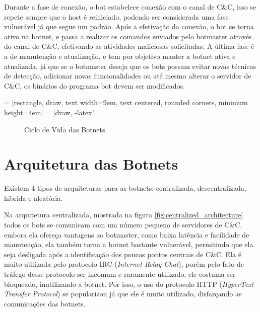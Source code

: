 Durante a fase de conexão, o bot estabelece conexão com o canal de C\&C, isso se repete sempre que o host é reiniciado, podendo ser considerada uma fase vulnerável já que segue um padrão. Após a efetivação da conexão, o bot se torna ativo na botnet, e passa a realizar os comandos enviados pelo botmaster através do canal de C\&C, efetivando as atividades maliciosas solicitadas. A última fase é a de manutenção e atualização, e tem por objetivo manter a botnet ativa e atualizada, já que se o botmaster deseja que os bots possam evitar novas técnicas de detecção, adicionar novas funcionalidades ou até mesmo alterar o servidor de C\&C, os binários do programa bot devem ser modificados.

 = [rectangle, draw, text width=9em, text centered, rounded corners, minimum height=4em]
 = [draw, -latex']

\begin{figure}
\centering
{}
\caption[Ciclo de Vida das Botnets]{Ciclo de Vida das Botnets} \label{fig:botnets_lifecycle}
\end{figure}

\section{Arquitetura das Botnets}
Existem 4 tipos de arquiteturas para as botnets: centralizada, descentralizada, híbrida e aleatória. 

Na arquitetura centralizada, mostrada na figura \ref{fig:centralized_architecture} todos os bots se comunicam com um número pequeno de servidores de C\&C, embora ela ofereça vantagens ao botmaster, como baixa latência e facilidade de manutenção, ela também torna a botnet bastante vulnerável, permitindo que ela seja desligada após a identificação dos poucos pontos centrais de C\&C. Ela é muito utilizada pelo protocolo IRC (\textit{Internet Relay Chat}), porém pelo fato de tráfego desse protocolo ser incomum e raramente utilizado, ele costuma ser bloqueado, inutilizando a botnet. Por isso, o uso do protocolo HTTP (\textit{HyperText Transfer Protocol}) se popularizou já que ele é muito utilizado, disfarçando as comunicações das botnets.

